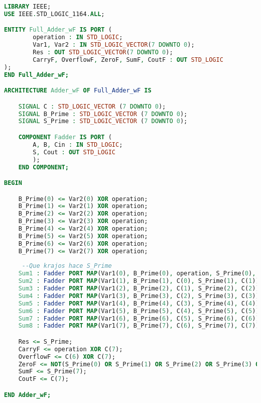 \begin{lstlisting}[language={vhdl}, caption={Full adder fw}, label={Script}]
LIBRARY IEEE;
USE IEEE.STD_LOGIC_1164.ALL;

ENTITY Full_Adder_wF IS PORT (
		operation : IN STD_LOGIC;
		Var1, Var2 : IN STD_LOGIC_VECTOR(7 DOWNTO 0);
		Res : OUT STD_LOGIC_VECTOR(7 DOWNTO 0);
		CarryF, OverflowF, ZeroF, SumF, CoutF : OUT STD_LOGIC
);
END Full_Adder_wF;

ARCHITECTURE Adder_wF OF Full_Adder_wF IS

    SIGNAL C : STD_LOGIC_VECTOR (7 DOWNTO 0);
    SIGNAL B_Prime : STD_LOGIC_VECTOR (7 DOWNTO 0);
    SIGNAL S_Prime : STD_LOGIC_VECTOR (7 DOWNTO 0);

    COMPONENT Fadder IS PORT (
        A, B, Cin : IN STD_LOGIC;
        S, Cout : OUT STD_LOGIC
        );
    END COMPONENT;

BEGIN

    B_Prime(0) <= Var2(0) XOR operation;
    B_Prime(1) <= Var2(1) XOR operation;
    B_Prime(2) <= Var2(2) XOR operation;
    B_Prime(3) <= Var2(3) XOR operation;
    B_Prime(4) <= Var2(4) XOR operation;
    B_Prime(5) <= Var2(5) XOR operation;
    B_Prime(6) <= Var2(6) XOR operation;
    B_Prime(7) <= Var2(7) XOR operation;
    
	 --Que krajos hace S_Prime
    Sum1 : Fadder PORT MAP(Var1(0), B_Prime(0), operation, S_Prime(0), C(0));
    Sum2 : Fadder PORT MAP(Var1(1), B_Prime(1), C(0), S_Prime(1), C(1));
    Sum3 : Fadder PORT MAP(Var1(2), B_Prime(2), C(1), S_Prime(2), C(2));
    Sum4 : Fadder PORT MAP(Var1(3), B_Prime(3), C(2), S_Prime(3), C(3));
    Sum5 : Fadder PORT MAP(Var1(4), B_Prime(4), C(3), S_Prime(4), C(4));
    Sum6 : Fadder PORT MAP(Var1(5), B_Prime(5), C(4), S_Prime(5), C(5));
    Sum7 : Fadder PORT MAP(Var1(6), B_Prime(6), C(5), S_Prime(6), C(6));
    Sum8 : Fadder PORT MAP(Var1(7), B_Prime(7), C(6), S_Prime(7), C(7));

    Res <= S_Prime;
    CarryF <= operation XOR C(7);
    OverflowF <= C(6) XOR C(7);
    ZeroF <= NOT(S_Prime(0) OR S_Prime(1) OR S_Prime(2) OR S_Prime(3) OR S_Prime(4) OR S_Prime(5) OR S_Prime(6) OR S_Prime(7));
    SumF <= S_Prime(7);
    CoutF <= C(7);

END Adder_wF;
	\end{lstlisting}
